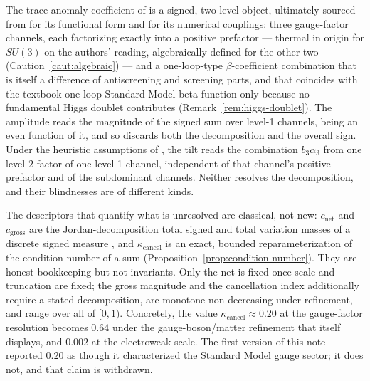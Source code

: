\documentclass[11pt]{article}
\theoremstyle{definition}
\theoremstyle{remark}
\newcommand{\net}{c_{\mathrm{net}}}
\newcommand{\gross}{c_{\mathrm{gross}}}
\newcommand{\kcancel}{\kappa_{\mathrm{cancel}}}
\begin{document}
The trace-anomaly coefficient of \citet{TurokBoyle2023} is a signed, two-level object, ultimately
sourced from \citet{ArnoldZhai1995} for its functional form and \citet{Buttazzo2013} for its
numerical couplings: three gauge-factor channels, each factorizing exactly into a positive
prefactor --- thermal in origin for $SU(3)$ on the authors' reading, algebraically defined for the
other two (Caution~\ref{caut:algebraic}) --- and a one-loop-type $\beta$-coefficient combination
that is itself a difference of antiscreening and screening parts, and that coincides with the
textbook one-loop Standard Model beta function only because no fundamental Higgs doublet
contributes (Remark~\ref{rem:higgs-doublet}). The amplitude reads the magnitude of the signed sum
over level-1 channels, being an even function of it, and so discards both the decomposition and the
overall sign. Under the heuristic assumptions of \citet{TurokBoyle2023}, the tilt reads the
combination $b_3\alpha_3$ from one level-2 factor of one level-1 channel, independent of that
channel's positive prefactor and of the subdominant channels. Neither resolves the decomposition,
and their blindnesses are of different kinds.

The descriptors that quantify what is unresolved are classical, not new: $\net$ and $\gross$ are
the Jordan-decomposition total signed and total variation masses of a discrete signed measure
\citep{Bogachev2007}, and $\kcancel$ is an exact, bounded reparameterization of the condition number
of a sum \citep{Higham1993} (Proposition~\ref{prop:condition-number}). They are honest bookkeeping
but not invariants. Only the net is fixed once scale and truncation are fixed; the gross magnitude
and the cancellation index additionally require a stated decomposition, are monotone non-decreasing
under refinement, and range over all of $[0,1)$. Concretely, the value $\kcancel \approx 0.20$ at
the gauge-factor resolution becomes $0.64$ under the gauge-boson/matter refinement that
\citet{TurokBoyle2023} itself displays, and $0.002$ at the electroweak scale. The first version of
this note reported $0.20$ as though it characterized the Standard Model gauge sector; it does not,
and that claim is withdrawn.
\end{document}
